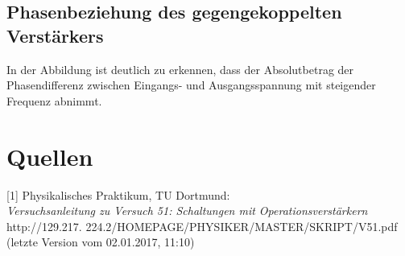 \documentclass[]{scrartcl}
\let\oldsection\section
\renewcommand\section{\clearpage\oldsection}
\begin{document}
\subsection{Phasenbeziehung des gegengekoppelten Verstärkers}
In der Abbildung ist deutlich zu erkennen, dass der Absolutbetrag der Phasendifferenz zwischen Eingangs- und Ausgangsspannung mit steigender Frequenz abnimmt. 

\section{Quellen}
{[1]} Physikalisches Praktikum, TU Dortmund: \\
\textit{Versuchsanleitung zu Versuch 51: Schaltungen mit Operationsverstärkern}\\
http://129.217.
224.2/HOMEPAGE/PHYSIKER/MASTER/SKRIPT/V51.pdf (letzte Version vom 02.01.2017, 11:10)\\
\end{document}
